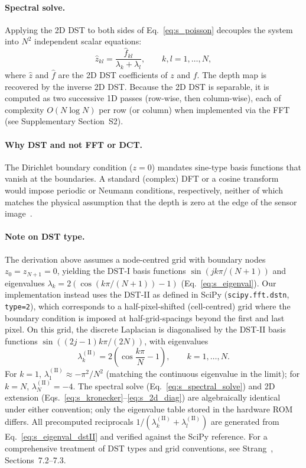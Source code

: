 \documentclass[10pt,a4paper]{article}
\begin{document}
\paragraph{Spectral solve.}
Applying the 2D DST to both sides of Eq.~\eqref{eq:s_poisson} decouples the system into $N^2$ independent scalar equations:
\begin{equation}
  \hat{z}_{kl} = \frac{\hat{f}_{kl}}{\lambda_k + \lambda_l}, \qquad k,l = 1,\ldots,N,
  \label{eq:s_spectral_solve}
\end{equation}
where $\hat{z}$ and $\hat{f}$ are the 2D DST coefficients of $z$ and $f$. The depth map is recovered by the inverse 2D DST. Because the 2D DST is separable, it is computed as two successive 1D passes (row-wise, then column-wise), each of complexity $O(N \log N)$ per row (or column) when implemented via the FFT (see Supplementary Section~S2).

\paragraph{Why DST and not FFT or DCT.}
The Dirichlet boundary condition ($z = 0$) mandates sine-type basis functions that vanish at the boundaries. A standard (complex) DFT or a cosine transform would impose periodic or Neumann conditions, respectively, neither of which matches the physical assumption that the depth is zero at the edge of the sensor image~\cite{strang2007cse}.

\paragraph{Note on DST type.}
The derivation above assumes a node-centred grid with boundary nodes $z_0 = z_{N+1} = 0$, yielding the DST-I basis functions $\sin(jk\pi/(N{+}1))$ and eigenvalues $\lambda_k = 2(\cos(k\pi/(N{+}1)) - 1)$ (Eq.~\eqref{eq:s_eigenval}). Our implementation instead uses the DST-II as defined in SciPy (\texttt{scipy.fft.dstn}, \texttt{type=2}), which corresponds to a half-pixel-shifted (cell-centred) grid where the boundary condition is imposed at half-grid-spacings beyond the first and last pixel. On this grid, the discrete Laplacian is diagonalised by the DST-II basis functions $\sin((2j{-}1)k\pi/(2N))$, with eigenvalues
\begin{equation}
  \lambda_k^{\mathrm{(II)}} = 2\!\left(\cos\frac{k\pi}{N} - 1\right), \qquad k = 1,\ldots,N.
  \label{eq:s_eigenval_dstII}
\end{equation}
For $k = 1$, $\lambda_1^{\mathrm{(II)}} \approx -\pi^2/N^2$ (matching the continuous eigenvalue in the limit); for $k = N$, $\lambda_N^{\mathrm{(II)}} = -4$. The spectral solve (Eq.~\eqref{eq:s_spectral_solve}) and 2D extension (Eqs.~\eqref{eq:s_kronecker}--\eqref{eq:s_2d_diag}) are algebraically identical under either convention; only the eigenvalue table stored in the hardware ROM differs. All precomputed reciprocals $1/(\lambda_k^{\mathrm{(II)}} + \lambda_l^{\mathrm{(II)}})$ are generated from Eq.~\eqref{eq:s_eigenval_dstII} and verified against the SciPy reference. For a comprehensive treatment of DST types and grid conventions, see Strang~\cite{strang2007cse}, Sections~7.2--7.3.
\end{document}
